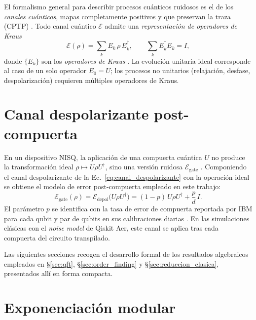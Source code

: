 \documentclass[12pt, spanish]{book}
\begin{document}
El formalismo general para describir procesos cuánticos ruidosos es el de los \textit{canales cuánticos}, mapas completamente positivos y que preservan la traza (CPTP) \cite{Nielsen2024, Watrous2018}. Todo canal cuántico $\mathcal{E}$ admite una \textit{representación de operadores de Kraus}
\begin{equation}
    \mathcal{E}(\rho) = \sum_{k} E_k\,\rho\,E_k^{\dagger}, \qquad \sum_k E_k^{\dagger}E_k = I,
    \label{eq:kraus}
\end{equation}
donde $\{E_k\}$ son los \textit{operadores de Kraus} \cite{Nielsen2024}. La evolución unitaria ideal corresponde al caso de un solo operador $E_0 = U$; los procesos no unitarios (relajación, desfase, despolarización) requieren múltiples operadores de Kraus.
 
\section{Canal despolarizante post-compuerta}
\label{app:despolarizante}
 
En un dispositivo NISQ, la aplicación de una compuerta cuántica $U$ no produce la transformación ideal $\rho \mapsto U\rho U^{\dagger}$, sino una versión ruidosa $\mathcal{E}_{\text{gate}}$ \cite{Preskill}. Componiendo el canal despolarizante de la Ec.~\ref{eq:canal_despolarizante} con la operación ideal se obtiene el modelo de error post-compuerta empleado en este trabajo:
\begin{equation}
    \mathcal{E}_{\text{gate}}(\rho) = \mathcal{E}_{\text{depol}}\big(U\rho U^{\dagger}\big) = (1-p)\,U\rho U^{\dagger} + \frac{p}{d}\,I.
    \label{eq:canal_gate}
\end{equation}
El parámetro $p$ se identifica con la tasa de error de compuerta reportada por IBM para cada qubit y par de qubits en sus calibraciones diarias \cite{AbuGhanem2025}. En las simulaciones clásicas con el \textit{noise model} de Qiskit Aer, este canal se aplica tras cada compuerta del circuito transpilado.

Las siguientes secciones recogen el desarrollo formal de los resultados algebraicos empleados en §\ref{sec:qft}, §\ref{sec:order_finding} y §\ref{sec:reduccion_clasica}, presentados allí en forma compacta.


\section{Exponenciación modular}
\label{app:exponenciacion-modular}
\end{document}
